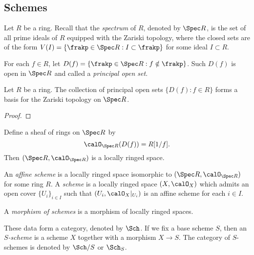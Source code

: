 \subsection{Schemes}


    Let \(R\) be a ring.
    Recall that the \emph{spectrum} of \(R\), denoted by \(\Spec R\), is the set of all prime ideals of \(R\) equipped with the Zariski topology, 
    where the closed sets are of the form \(V(I) = \{\frakp \in \Spec R : I \subset \frakp\}\) for some ideal \(I \subset R\).

    For each \(f \in R\), let \(D(f) = \{\frakp \in \Spec R : f \notin \frakp\}\).
    Such \(D(f)\) is open in \(\Spec R\) and called a \emph{principal open set}.
    
    \begin{proposition}\label{prop:principal_open_sets_form_a_basis}
        Let \(R\) be a ring.
        The collection of principal open sets \(\{D(f) : f \in R\}\) forms a basis for the Zariski topology on \(\Spec R\).
    \end{proposition}
    \begin{proof}
    \end{proof}

    Define a sheaf of rings on \(\Spec R\) by 
    \[ \calO_{\Spec R}(D(f)) = R[1/f]. \]
    Then \((\Spec R, \calO_{\Spec R})\) is a locally ringed space.

    \begin{definition}\label{def:affine_scheme_and_scheme}
        An \emph{affine scheme} is a locally ringed space isomorphic to \((\Spec R, \calO_{\Spec R})\) for some ring \(R\).
        A \emph{scheme} is a locally ringed space \((X, \calO_X)\) which admits an open cover \(\{U_i\}_{i \in I}\) such that \((U_i, \calO_X|_{U_i})\) is an affine scheme for each \(i \in I\).

        A \emph{morphism of schemes} is a morphism of locally ringed spaces.

        These data form a category, denoted by \(\Sch\).
        If we fix a base scheme \(S\), then an \emph{\(S\)-scheme} is a scheme \(X\) together with a morphism \(X \to S\).
        The category of \(S\)-schemes is denoted by \(\Sch/S\) or \(\Sch_S\).
    \end{definition}

